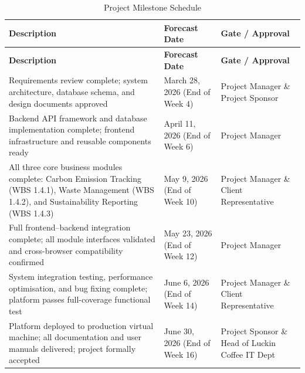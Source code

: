 \documentclass[12pt,a4paper]{article}
\begin{document}
{\footnotesize
\begin{longtable}{@{}>{\raggedright\arraybackslash}p{5.5cm}>{\centering\arraybackslash}p{3cm}>{\raggedright\arraybackslash}p{3.5cm}@{}}
\caption{Project Milestone Schedule}\label{tab:milestone_schedule}\\
\toprule
\textbf{Description} & \textbf{Forecast Date} & \textbf{Gate / Approval} \\
\midrule
\endfirsthead
\toprule
\textbf{Description} & \textbf{Forecast Date} & \textbf{Gate / Approval} \\
\midrule
\endhead

Requirements review complete; system architecture, database schema, and design documents approved
& March 28, 2026 \newline (End of Week 4)
& Project Manager \& Project Sponsor \\

\midrule

Backend API framework and database implementation complete; frontend infrastructure and reusable components ready
& April 11, 2026 \newline (End of Week 6)
& Project Manager \\

\midrule

All three core business modules complete: Carbon Emission Tracking (WBS 1.4.1), Waste Management (WBS 1.4.2), and Sustainability Reporting (WBS 1.4.3)
& May 9, 2026 \newline (End of Week 10)
& Project Manager \& Client Representative \\

\midrule

Full frontend--backend integration complete; all module interfaces validated and cross-browser compatibility confirmed
& May 23, 2026 \newline (End of Week 12)
& Project Manager \\

\midrule

System integration testing, performance optimisation, and bug fixing complete; platform passes full-coverage functional test
& June 6, 2026 \newline (End of Week 14)
& Project Manager \& Client Representative \\

\midrule

Platform deployed to production virtual machine; all documentation and user manuals delivered; project formally accepted
& June 30, 2026 \newline (End of Week 16)
& Project Sponsor \& Head of Luckin Coffee IT Dept \\

\bottomrule
\end{longtable}
}
\end{document}
